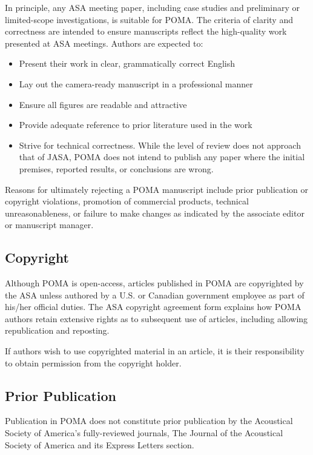 \documentclass[12pt,letter]{article}
\begin{document}
In principle, any ASA meeting paper, including case studies and preliminary or limited-scope investigations, is suitable for POMA. The criteria of clarity and correctness are intended to ensure manuscripts reflect the high-quality work presented at ASA meetings. Authors are expected to:
\begin{itemize}
	\item Present their work in clear, grammatically correct English
	\item Lay out the camera-ready manuscript in a professional manner
	\item Ensure all figures are readable and attractive
	\item Provide adequate reference to prior literature used in the work
	\item Strive for technical correctness. While the level of review does not approach that of JASA, POMA does not intend to publish any paper where the initial premises, reported results, or conclusions are wrong. 
\end{itemize}

Reasons for ultimately rejecting a POMA manuscript include prior publication or copyright violations, promotion of commercial products, technical unreasonableness, or failure to make changes as indicated by the associate editor or manuscript manager. 

\subsection{Copyright}

Although POMA is open-access, articles published in POMA are copyrighted by the ASA unless authored by a U.S. or Canadian government employee as part of his/her official duties. The ASA copyright agreement form explains how POMA authors retain extensive rights as to subsequent use of articles, including allowing republication and reposting.

If authors wish to use copyrighted material in an article, it is their responsibility to obtain permission from the copyright holder.

\subsection{Prior Publication}

Publication in POMA does not constitute prior publication by the Acoustical Society of America's fully-reviewed journals, The Journal of the Acoustical Society of America and its Express Letters section.
\end{document}
